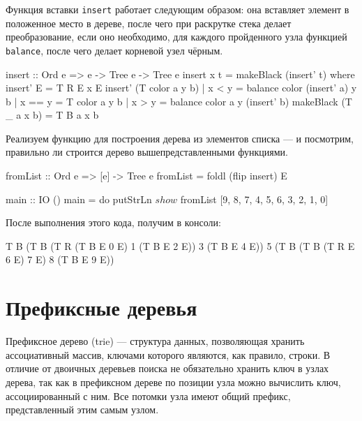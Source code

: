 Функция вставки \lstinline{insert} работает следующим образом: она вставляет элемент в положенное место в дереве, после чего при раскрутке стека делает преобразование, если оно необходимо, для каждого пройденного узла функцией \lstinline{balance}, после чего делает корневой узел чёрным.
\begin{hslst}{}{}
insert :: Ord e => e -> Tree e -> Tree e
insert x t = makeBlack (insert' t)
  where insert' E = T R E x E
        insert' (T color a y b) | x <  y = balance color (insert' a) y b
                                | x == y = T color a y b
                                | x >  y = balance color a y (insert' b)
        makeBlack (T _ a x b) = T B a x b
\end{hslst}

Реализуем функцию для построения дерева из элементов списка — и посмотрим, правильно ли строится дерево вышепредставленными функциями.
\begin{hslst}{}{}
fromList :: Ord e => [e] -> Tree e
fromList = foldl (flip insert) E

main :: IO ()
main = do
  putStrLn $ show $ fromList [9, 8, 7, 4, 5, 6, 3, 2, 1, 0]
\end{hslst}

После выполнения этого кода, получим в консоли:
\begin{plainlst}{}{}
T B (T B (T R (T B E 0 E) 1 (T B E 2 E)) 3 (T B E 4 E)) 5 (T B (T B (T R E 6 E) 7 E) 8 (T B E 9 E))
\end{plainlst}

\section{Префиксные деревья}
\label{sec:trie}
Префиксное дерево (trie) — структура данных, позволяющая хранить ассоциативный массив, ключами которого являются, как правило, строки. В отличие от двоичных деревьев поиска не обязательно хранить ключ в узлах дерева, так как в префиксном дереве по позиции узла можно вычислить ключ, ассоциированный с ним. Все потомки узла имеют общий префикс, представленный этим самым узлом.

